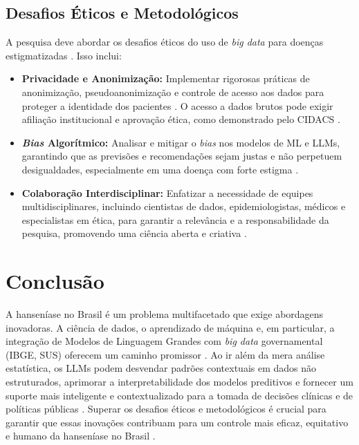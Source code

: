 \documentclass{article}
\begin{document}
\subsection{Desafios Éticos e Metodológicos}
A pesquisa deve abordar os desafios éticos do uso de \textit{big data} para doenças estigmatizadas \cite{inovacao_computacional_hanseniase, saldanha2021ciencia}. Isso inclui:
\begin{itemize}
    \item \textbf{Privacidade e Anonimização:} Implementar rigorosas práticas de anonimização, pseudoanonimização e controle de acesso aos dados para proteger a identidade dos pacientes \cite{inovacao_computacional_hanseniase, saldanha2021ciencia}. O acesso a dados brutos pode exigir afiliação institucional e aprovação ética, como demonstrado pelo CIDACS \cite{cerqueirasilva2024risk}.
    \item \textbf{\textit{Bias} Algorítmico:} Analisar e mitigar o \textit{bias} nos modelos de ML e LLMs, garantindo que as previsões e recomendações sejam justas e não perpetuem desigualdades, especialmente em uma doença com forte estigma \cite{inovacao_computacional_hanseniase, brasil2022pcdt}.
    \item \textbf{Colaboração Interdisciplinar:} Enfatizar a necessidade de equipes multidisciplinares, incluindo cientistas de dados, epidemiologistas, médicos e especialistas em ética, para garantir a relevância e a responsabilidade da pesquisa, promovendo uma ciência aberta e criativa \cite{saldanha2021ciencia}.
\end{itemize}

\section{Conclusão}
A hanseníase no Brasil é um problema multifacetado que exige abordagens inovadoras. A ciência de dados, o aprendizado de máquina e, em particular, a integração de Modelos de Linguagem Grandes com \textit{big data} governamental (IBGE, SUS) oferecem um caminho promissor \cite{saldanha2021ciencia, inovacao_computacional_hanseniase}. Ao ir além da mera análise estatística, os LLMs podem desvendar padrões contextuais em dados não estruturados, aprimorar a interpretabilidade dos modelos preditivos e fornecer um suporte mais inteligente e contextualizado para a tomada de decisões clínicas e de políticas públicas \cite{bigdata_review, brasil2022pcdt}. Superar os desafios éticos e metodológicos é crucial para garantir que essas inovações contribuam para um controle mais eficaz, equitativo e humano da hanseníase no Brasil \cite{saldanha2021ciencia, inovacao_computacional_hanseniase}.

\end{document}
